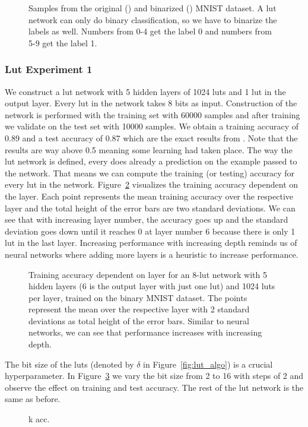 \begin{figure}[!htb]
\begin{minipage}[b]{.4\linewidth}
      \label{fig:mnist_dataset_binarized}
  \end{minipage}
  \caption{Samples from the original () and binarized () MNIST dataset. A lut network can only do binary classification, so we have to binarize the labels as well. Numbers from 0-4 get the label 0 and numbers from 5-9 get the label 1.}
\label{fig:mnist_dataset}
\end{figure}

\subsubsection{Lut Experiment 1}
We construct a lut network with 5 hidden layers of 1024 luts and 1 lut in the output layer. Every lut in the network takes 8 bits as input. Construction of the network is performed with the training set with 60000 samples and after training we validate on the test set with 10000 samples. We obtain a training accuracy of 0.89 and a test accuracy of 0.87 which are the exact results from \cite{chatterjee2018learning}. Note that the results are way above 0.5 meaning some learning had taken place. The way the lut network is defined, every does already a prediction on the example passed to the network. That means we can compute the training (or testing) accuracy for every lut in the network. Figure~\ref{fig:ex1_depth_performance} visualizes the training accuracy dependent on the layer. Each point represents the mean training accuracy over the respective layer and the total height of the error bars are two standard deviations. We can see that with increasing layer number, the accuracy goes up and the standard deviation goes down until it reaches 0 at layer number 6 because there is only 1 lut in the last layer. Increasing performance with increasing depth reminds us of neural networks where adding more layers is a heuristic to increase performance.

\begin{figure}[!htb]
    \centering
    
    \caption{Training accuracy dependent on layer for an 8-lut network with 5 hidden layers (6 is the output layer with just one lut) and 1024 luts per layer, trained on the binary MNIST dataset. The points represent the mean over the respective layer with 2 standard deviations as total height of the error bars. Similar to neural networks, we can see that performance increases with increasing depth.}
\label{fig:ex1_depth_performance}
\end{figure}

The bit size of the luts (denoted by $\delta$ in Figure~\ref{fig:lut_algo}) is a crucial hyperparameter. In Figure~\ref{fig:ex1_k_acc} we vary the bit size from 2 to 16 with steps of 2 and observe the effect on training and test accuracy. The rest of the lut network is the same as before.

\begin{figure}[!htb]
    \centering
    
    \caption{k acc.}
\label{fig:ex1_k_acc}
\end{figure}
